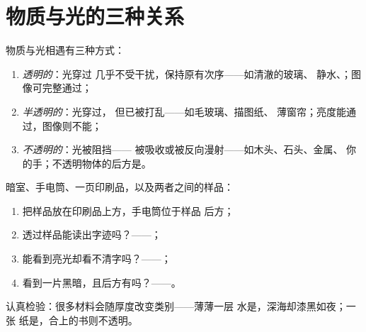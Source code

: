 \section{物质与光的三种关系}

\begin{definition}[透明、半透明与不透明]\label{def:g7:light-sources-propagation:coats}
物质与光相遇有三种方式：
\begin{enumerate}
  \item \emph{透明的}：光穿过
        几乎不受干扰，保持原有次序——如清澈的玻璃、
        静水、；图像可完整通过；
  \item \emph{半透明的}：光穿过，
        但已被打乱——如毛玻璃、描图纸、
        薄窗帘；亮度能通过，图像则不能；
  \item \emph{不透明的}：光被阻挡——
        被吸收或被反向漫射——如木头、石头、金属、
        你的手；不透明物体的后方是。
\end{enumerate}
\end{definition}

\begin{method}[用手电光给材料分类]\label{met:g7:light-sources-propagation:sort}
暗室、手电筒、一页印刷品，以及两者之间的样品：
\begin{enumerate}
  \item 把样品放在印刷品上方，手电筒位于样品
        后方；
  \item 透过样品能读出字迹吗？——；
  \item 能看到亮光却看不清字吗？——；
  \item 看到一片黑暗，且后方有吗？——。
\end{enumerate}
认真检验：很多材料会随厚度改变类别——薄薄一层
水是，深海却漆黑如夜；一张
纸是，合上的书则不透明。
\end{method}

